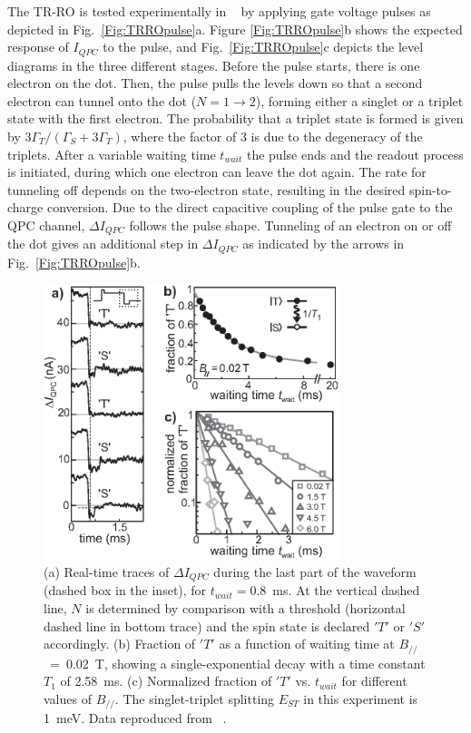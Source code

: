 \documentclass[12pt,aps,nofootinbib]{revtex4-1}
\begin{document}
The TR-RO is tested experimentally in ~\textcite{HansonPRL2005} by applying gate voltage pulses as depicted in Fig.~\ref{Fig:TRROpulse}a. Figure \ref{Fig:TRROpulse}b shows the expected response of $I_{QPC}$ to the pulse, and Fig.~\ref{Fig:TRROpulse}c depicts the level diagrams in the three different stages. Before the pulse starts, there is one electron on the dot. Then, the pulse pulls the levels down so that a second electron can tunnel onto the dot ($N\!=\!1\!\rightarrow\!2$), forming either a singlet or a triplet state with the first electron.
The probability that a triplet state is formed is given by
$3\Gamma_T/(\Gamma_S + 3\Gamma_T)$, where the factor of 3 is due
to the degeneracy of the triplets. After a variable waiting time
$t_{wait}$ the pulse ends and the readout process is initiated,
during which one electron can leave the dot again. The rate for
tunneling off depends on the two-electron state, resulting in the
desired spin-to-charge conversion. Due to the direct capacitive
coupling of the pulse gate to the QPC channel, $\Delta I_{QPC}$
follows the pulse shape. Tunneling of an electron on or off the
dot gives an additional step in $\Delta I_{QPC}$ as indicated by
the arrows in Fig.~\ref{Fig:TRROpulse}b.

\begin{figure}[htb]
\includegraphics[width=3.4in, clip=true]{hanson_fig18.eps}
\caption{(a) Real-time traces of $\Delta I_{QPC}$ during the last
part of the waveform (dashed box in the inset), for
$t_{wait}\!=0.8$~ms. At the vertical dashed line, $N$ is
determined by comparison with a threshold (horizontal dashed line
in bottom trace) and the spin state is declared $'T'$ or $'S'$
accordingly. (b) Fraction of $'T'$ as a function of waiting time
at $B_{/\!/}\!$~=~0.02~T, showing a single-exponential decay with
a time constant $T_1$ of 2.58~ms. (c) Normalized fraction of $'T'$
vs. $t_{wait}$ for different values of $B_{/\!/}$. The
singlet-triplet splitting $E_{ST}$ in this experiment is 1~meV. Data reproduced from ~\textcite{HansonPRL2005}.}
\label{Fig:TRROresult}
\end{figure}
\end{document}
